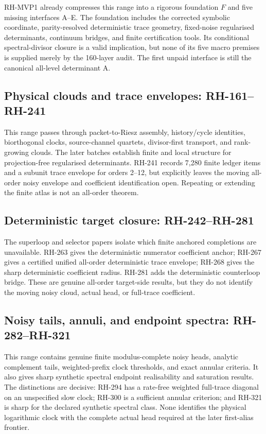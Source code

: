 \documentclass[11pt]{article}
\theoremstyle{definition}
\theoremstyle{remark}
\begin{document}
RH-MVP1 already compresses this range into a rigorous foundation $F$ and five
missing interfaces A--E.  The foundation includes the corrected symbolic
coordinate, parity-resolved deterministic trace geometry, fixed-noise
regularised determinants, continuum bridges, and finite certification tools.
Its conditional spectral-divisor closure is a valid implication, but none of
its five macro premises is supplied merely by the 160-layer audit.  The first
unpaid interface is still the canonical all-level determinant A.

\subsection{Physical clouds and trace envelopes: RH-161--RH-241}

This range passes through packet-to-Riesz assembly, history/cycle identities,
biorthogonal clocks, source-channel quartets, divisor-first transport, and
rank-growing clouds.  The later batches establish finite and local structure
for projection-free regularised determinants.  RH-241 records 7,280 finite
ledger items and a subunit trace envelope for orders 2--12, but explicitly
leaves the moving all-order noisy envelope and coefficient identification
open.  Repeating or extending the finite atlas is not an all-order theorem.

\subsection{Deterministic target closure: RH-242--RH-281}

The superloop and selector papers isolate which finite anchored completions
are unavailable.  RH-263 gives the deterministic numerator coefficient
anchor; RH-267 gives a certified unified all-order deterministic trace
envelope; RH-268 gives the sharp deterministic coefficient radius.  RH-281
adds the deterministic counterloop bridge.  These are genuine all-order
target-side results, but they do not identify the moving noisy cloud, actual
head, or full-trace coefficient.

\subsection{Noisy tails, annuli, and endpoint spectra: RH-282--RH-321}

This range contains genuine finite modulus-complete noisy heads, analytic
complement tails, weighted-prefix clock thresholds, and exact annular
criteria.  It also gives sharp synthetic spectral endpoint realisability and
saturation results.  The distinctions are decisive: RH-294 has a rate-free
weighted full-trace diagonal on an unspecified slow clock; RH-300 is a
sufficient annular criterion; and RH-321 is sharp for the declared synthetic
spectral class.  None identifies the physical logarithmic clock with the
complete actual head required at the later first-alias frontier.
\end{document}
